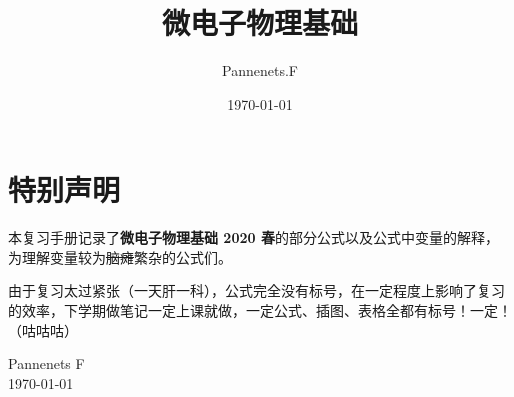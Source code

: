 \documentclass[cn,11pt,chinese,black,simple]{elegantbook}
\title{微电子物理基础}
\author{Pannenets.F}
\date{\today}
\begin{document}
\maketitle
\frontmatter

\chapter*{特别声明}

本复习手册记录了\textbf{微电子物理基础 2020 春}的部分公式以及公式中变量的解释，为理解变量较为\sout{脑瘫}繁杂的公式们。

由于复习太过紧张（一天肝一科），公式完全没有标号，在一定程度上影响了复习的效率，下学期做笔记一定上课就做，一定公式、插图、表格全都有标号！一定！（咕咕咕）

\vskip 1.5cm


\begin{flushright}
Pannenets F\\
\today
\end{flushright}

\tableofcontents

\mainmatter








\end{document}
